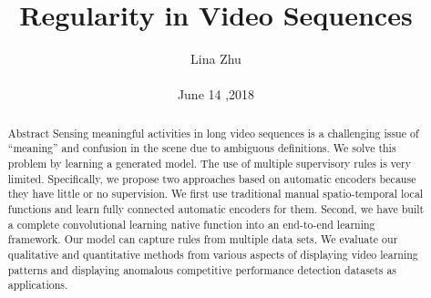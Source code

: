 \documentclass[10pt,twocolumn,letterpaper]{article}
\begin{document}
\title{Regularity in Video Sequences}
\author{Lina Zhu\\\\June 14 ,2018}
\maketitle
\begin{abstract}
Abstract
Sensing meaningful activities in long video sequences is a challenging issue of “meaning” and confusion in the scene due to ambiguous definitions. We solve this problem by learning a generated model. The use of multiple supervisory rules is very limited. Specifically, we propose two approaches based on automatic encoders because they have little or no supervision. We first use traditional manual spatio-temporal local functions and learn fully connected automatic encoders for them. Second, we have built a complete convolutional learning native function into an end-to-end learning framework. Our model can capture rules from multiple data sets. We evaluate our qualitative and quantitative methods from various aspects of displaying video learning patterns and displaying anomalous competitive performance detection datasets as applications.
\end{abstract}
\end{document}
